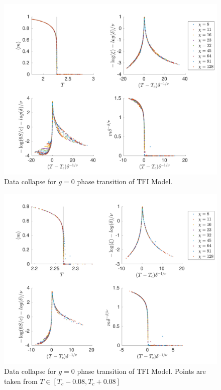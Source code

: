 \begin{figure}[!htbp]
  \center
  \includegraphics[width=\textwidth]{Figuren/phasediag/g0/Full.pdf}
  \caption{ Data collapse for $g=0$ phase transition of \Gls{TFI} Model. }
  \label{fig:phase:g0:full}
\end{figure}
\begin{figure}[!htbp]
  \center
  \includegraphics[width=\textwidth]{Figuren/phasediag/g0/zoomed.pdf}
  \caption{ Data collapse for $g=0$ phase transition of \Gls{TFI} Model. Points are taken from $T \in \left[ T_c -0.08, T_c +0.08 \right]$ }
  \label{fig:phase:g0:zoomed}
\end{figure}

